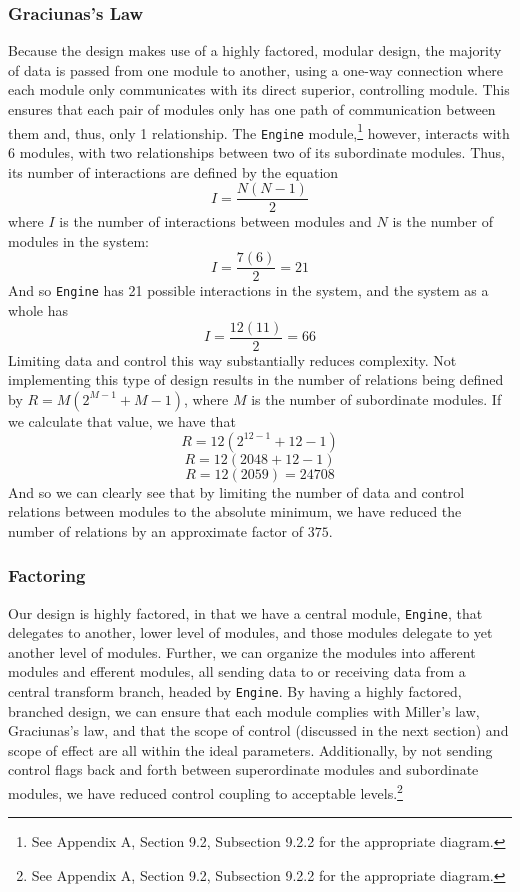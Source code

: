 \documentclass{article}
\begin{document}
		\subsubsection{Graciunas's Law}
			Because the design makes use of a highly factored, modular design, the majority of data is passed from one module to another, using a one-way connection where each module only communicates with its direct superior, controlling module. This ensures that each pair of modules only has one path of communication between them and, thus, only 1 relationship. The \texttt{Engine} module,\footnote{See Appendix A, Section 9.2, Subsection 9.2.2 for the appropriate diagram.} however, interacts with 6 modules, with two relationships between two of its subordinate modules. Thus, its number of interactions are defined by the equation $$I = \frac{N(N - 1)}{2}$$
			where $I$ is the number of interactions between modules and $N$ is the number of modules in the system:
			$$I = \frac{7(6)}{2} = 21$$
			And so \texttt{Engine} has 21 possible interactions in the system, and the system as a whole has 
			$$I = \frac{12(11)}{2} = 66$$
			Limiting data and control this way substantially reduces complexity. Not implementing this type of design results in the number of relations being defined by $R = M(2^{M-1} + M - 1)$, where $M$ is the number of subordinate modules. If we calculate that value, we have that
			$$R = 12(2^{12-1} + 12 - 1)$$
			$$R = 12(2048 + 12 - 1)$$
			$$R = 12(2059) = 24708$$
			And so we can clearly see that by limiting the number of data and control relations between modules to the absolute minimum, we have reduced the number of relations by an approximate factor of $375$. 
		\subsubsection{Factoring}
			Our design is highly factored, in that we have a central module, \texttt{Engine}, that delegates to another, lower level of modules, and those modules delegate to yet another level of modules. Further, we can organize the modules into afferent modules and efferent modules, all sending data to or receiving data from a central transform branch, headed by \texttt{Engine}. By having a highly factored, branched design, we can ensure that each module complies with Miller's law, Graciunas's law, and that the scope of control (discussed in the next section) and scope of effect are all within the ideal parameters. Additionally, by not sending control flags back and forth between superordinate modules and subordinate modules, we have reduced control coupling to acceptable levels.\footnote{See Appendix A, Section 9.2, Subsection 9.2.2 for the appropriate diagram.}  
\end{document}
